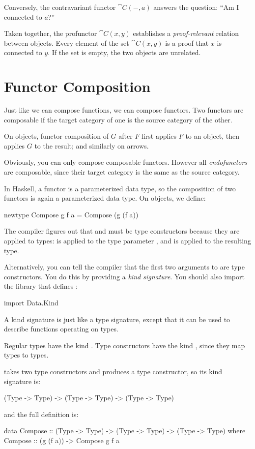 \documentclass[DaoFP]{subfiles}
\begin{document}
Conversely, the contravariant functor $\cat C (-, a)$ answers the question: ``Am I connected to $a$?''

Taken together, the profunctor $\cat C(x, y)$ establishes a \emph{proof-relevant} relation between objects. Every element of the set $\cat C(x, y)$ is a proof that $x$ is connected to $y$. If the set is empty, the two objects are unrelated. 

\section{Functor Composition}

Just like we can compose functions, we can compose functors. Two functors are composable if the target category of one is the source category of the other.

 On objects, functor composition of $G$ after $F$ first applies $F$ to an object, then applies $G$ to the result; and similarly on arrows.
 
 Obviously, you can only compose composable functors. However all \emph{endofunctors} are composable, since their target category is the same as the source category.
 
 In Haskell, a functor is a parameterized data type, so the composition of two functors is again a parameterized data type. On objects, we define:
 \begin{haskell}
newtype Compose g f a = Compose (g (f a))
\end{haskell}
The compiler figures out that  and  must be type constructors because they are applied to types:  is applied to the type parameter , and  is applied to the resulting type.

Alternatively, you can tell the compiler that the first two arguments to  are type constructors. You do this by providing a \emph{kind signature}. You should also import the  library that defines :
\begin{haskell}
import Data.Kind
\end{haskell}

A kind signature is just like a type signature, except that it can be used to describe functions operating on types. 

Regular types have the kind . Type constructors have the kind , since they map types to types. 

 takes two type constructors and produces a type constructor, so its kind signature is:
\begin{haskell}
(Type -> Type) -> (Type -> Type) -> (Type -> Type) 
\end{haskell}
and the full definition is:
\begin{haskell}
data Compose :: (Type -> Type) -> (Type -> Type) -> (Type -> Type) 
  where
    Compose :: (g (f a)) -> Compose g f a
\end{haskell}
\end{document}

